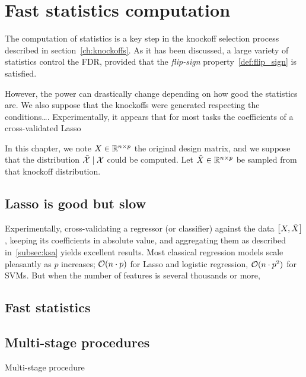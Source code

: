 \chapter{Fast statistics computation}\label{ch:fsc}

The computation of statistics is a key step in the knockoff selection process described in section~\ref{ch:knockoffs}.
As it has been discussed, a large variety of statistics control the FDR,
provided that the \textit{flip-sign} property~\ref{def:flip_sign} is satisfied.

However, the power can drastically change depending on how good the statistics are.
We also suppose that the knockoffs were generated respecting the conditions\dots.
Experimentally, it appears that for most tasks the coefficients of a cross-validated Lasso

In this chapter, we note $X \in \mathbb{R}^{n \times p}$ the original design matrix,
and we suppose that the distribution $\tilde{\mathcal{X}} \mid \mathcal{X}$ could be computed.
Let $\tilde{X} \in \mathbb{R}^{n \times p}$ be sampled from that knockoff distribution.

\section{Lasso is good but slow}\label{sec:}

Experimentally, cross-validating a regressor (or classifier) against the data $\big[ X, \tilde{X} \big]$,
keeping its coefficients in absolute value,
and aggregating them as described in~\ref{subsec:ksa} yields excellent results.
Most classical regression models scale pleasantly as $p$ increases;
$\mathcal{O}(n \cdot p)$ for Lasso and logistic regression,
$\mathcal{O}(n \cdot p^2)$ for SVMs.
But when the number of features is several thousands or more,


\section{Fast statistics}\label{sec:a}

\section{Multi-stage procedures}\label{sec:multi_stage}

Multi-stage procedure~\cite{multi_stage_fdr}
